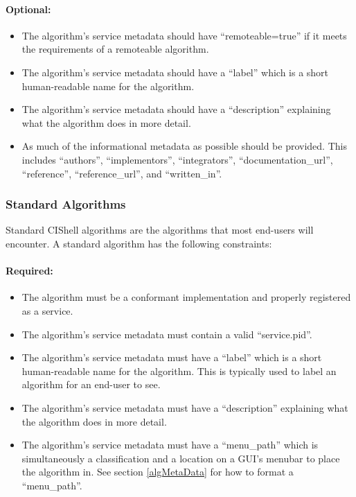 \paragraph*{Optional:}
\begin{itemize}
  \item The algorithm's service metadata should have ``remoteable=true'' if it
  meets the requirements of a remoteable algorithm.
  \item The algorithm's service metadata should have a ``label'' which is a
  short human-readable name for the algorithm.
  \item The algorithm's service metadata should have a ``description''
  explaining what the algorithm does in more detail.
  \item As much of the informational metadata as possible should be
  provided. This includes ``authors'', ``implementors'', ``integrators'',
  ``documentation\_url'', ``reference'', ``reference\_url'', and ``written\_in''.
\end{itemize}

\subsubsection{Standard Algorithms}

Standard CIShell algorithms are the algorithms that most end-users will
encounter. A standard algorithm has the following constraints:

\paragraph*{Required:}
\begin{itemize}
  \item The algorithm must be a conformant 
  implementation and properly registered as a service.
  \item The algorithm's service metadata must contain a valid ``service.pid''.
  \item The algorithm's service metadata must have a ``label'' which is a
  short human-readable name for the algorithm. This is typically used to label
  an algorithm for an end-user to see.
  \item The algorithm's service metadata must have a ``description''
  explaining what the algorithm does in more detail.
  \item The algorithm's service metadata must have a ``menu\_path'' which is
  simultaneously a classification and a location on a GUI's menubar to place
  the algorithm in. See section \ref{algMetaData} for how to format a
  ``menu\_path''.
\end{itemize}

